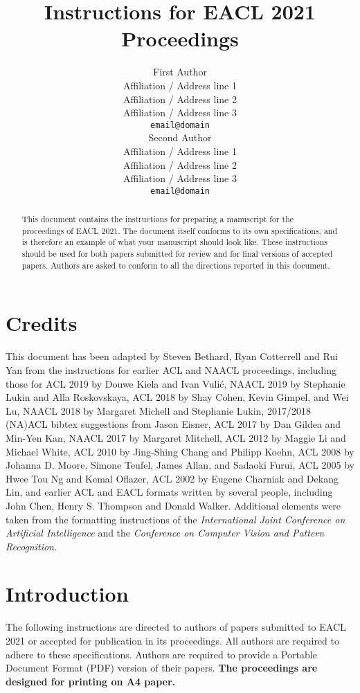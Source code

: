 \documentclass[11pt,a4paper]{article}
\title{Instructions for EACL 2021 Proceedings}
\author{First Author \\
  Affiliation / Address line 1 \\
  Affiliation / Address line 2 \\
  Affiliation / Address line 3 \\
  \texttt{email@domain} \\\And
  Second Author \\
  Affiliation / Address line 1 \\
  Affiliation / Address line 2 \\
  Affiliation / Address line 3 \\
  \texttt{email@domain} \\}
\date{}
\begin{document}
\maketitle
\begin{abstract}
This document contains the instructions for preparing a manuscript for the proceedings of EACL 2021.
The document itself conforms to its own specifications, and is therefore an example of what your manuscript should look like.
These instructions should be used for both papers submitted for review and for final versions of accepted papers.
Authors are asked to conform to all the directions reported in this document.
\end{abstract}

\section{Credits}

This document has been adapted
by Steven Bethard, Ryan Cotterrell and Rui Yan
from the instructions for earlier ACL and NAACL proceedings, including those for 
ACL 2019 by Douwe Kiela and Ivan Vuli\'{c},
NAACL 2019 by Stephanie Lukin and Alla Roskovskaya, 
ACL 2018 by Shay Cohen, Kevin Gimpel, and Wei Lu, 
NAACL 2018 by Margaret Michell and Stephanie Lukin,
2017/2018 (NA)ACL bibtex suggestions from Jason Eisner,
ACL 2017 by Dan Gildea and Min-Yen Kan, 
NAACL 2017 by Margaret Mitchell, 
ACL 2012 by Maggie Li and Michael White, 
ACL 2010 by Jing-Shing Chang and Philipp Koehn, 
ACL 2008 by Johanna D. Moore, Simone Teufel, James Allan, and Sadaoki Furui, 
ACL 2005 by Hwee Tou Ng and Kemal Oflazer, 
ACL 2002 by Eugene Charniak and Dekang Lin, 
and earlier ACL and EACL formats written by several people, including
John Chen, Henry S. Thompson and Donald Walker.
Additional elements were taken from the formatting instructions of the \emph{International Joint Conference on Artificial Intelligence} and the \emph{Conference on Computer Vision and Pattern Recognition}.

\section{Introduction}

The following instructions are directed to authors of papers submitted to EACL 2021 or accepted for publication in its proceedings.
All authors are required to adhere to these specifications.
Authors are required to provide a Portable Document Format (PDF) version of their papers.
\textbf{The proceedings are designed for printing on A4 paper.}
\end{document}
